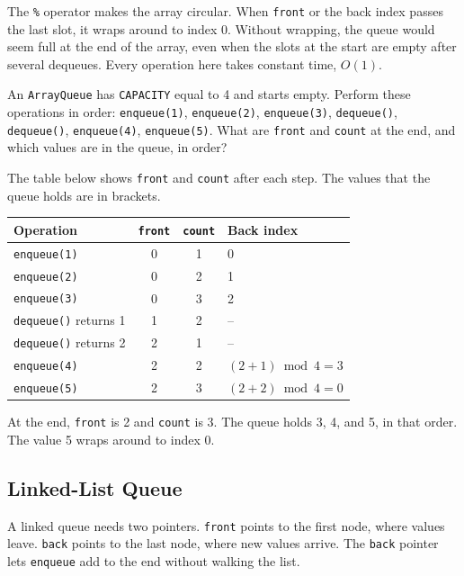 The \texttt{\%} operator makes the array circular. When \texttt{front} or the back index passes the last slot, it wraps around to index 0. Without wrapping, the queue would seem full at the end of the array, even when the slots at the start are empty after several dequeues. Every operation here takes constant time, $O(1)$.

\begin{Exercise}[title={Tracing a Circular Queue}, label=queue1]
An \texttt{ArrayQueue} has \texttt{CAPACITY} equal to 4 and starts empty. Perform these operations in order: \texttt{enqueue(1)}, \texttt{enqueue(2)}, \texttt{enqueue(3)}, \texttt{dequeue()}, \texttt{dequeue()}, \texttt{enqueue(4)}, \texttt{enqueue(5)}. What are \texttt{front} and \texttt{count} at the end, and which values are in the queue, in order?
\end{Exercise}
\begin{Answer}[ref=queue1]
The table below shows \texttt{front} and \texttt{count} after each step. The values that the queue holds are in brackets.
\begin{center}
\begin{tabular}{|l|c|c|l|}
\hline
Operation & \texttt{front} & \texttt{count} & Back index \\
\hline
\texttt{enqueue(1)} & 0 & 1 & 0 \\
\texttt{enqueue(2)} & 0 & 2 & 1 \\
\texttt{enqueue(3)} & 0 & 3 & 2 \\
\texttt{dequeue()} returns 1 & 1 & 2 & -- \\
\texttt{dequeue()} returns 2 & 2 & 1 & -- \\
\texttt{enqueue(4)} & 2 & 2 & $(2 + 1) \bmod 4 = 3$ \\
\texttt{enqueue(5)} & 2 & 3 & $(2 + 2) \bmod 4 = 0$ \\
\hline
\end{tabular}
\end{center}
At the end, \texttt{front} is 2 and \texttt{count} is 3. The queue holds 3, 4, and 5, in that order. The value 5 wraps around to index 0.
\end{Answer}

\subsection{Linked-List Queue}
A linked queue needs two pointers. \texttt{front} points to the first node, where values leave. \texttt{back} points to the last node, where new values arrive. The \texttt{back} pointer lets \texttt{enqueue} add to the end without walking the list.

